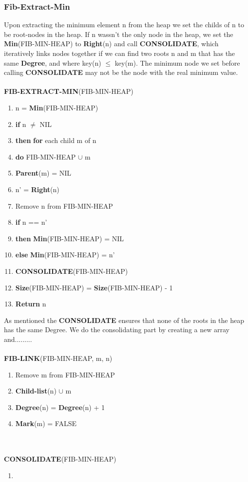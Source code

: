 \documentclass[11pt]{article}
\begin{document}
\subsubsection{Fib-Extract-Min}
Upon extracting the minimum element n from the heap we set the childs of n to be root-nodes in the heap. If n wassn't the only node in the heap, we set the \textbf{Min}(FIB-MIN-HEAP) to \textbf{Right}(n) and call \textbf{CONSOLIDATE}, which iteratively links nodes together if we can find two roots n and m that has the same \textbf{Degree}, and where key(n) $\leq$ key(m). The minimum node we set before calling \textbf{CONSOLIDATE} may not be the node with the real minimum value.\\\\
\textbf{FIB-EXTRACT-MIN}(FIB-MIN-HEAP)
\begin{enumerate}
\setlength\itemsep{0em}
\item n = \textbf{Min}(FIB-MIN-HEAP)
\item \textbf{if } n $\neq$ NIL
\item \tab \textbf{then } \textbf{for } each child m of n
\item \tab \tab \tab \textbf{do } FIB-MIN-HEAP $\cup$ m
\item \tab \tab \tab \tab \textbf{Parent}(m) = NIL
\item \tab \tab \tab n' = \textbf{Right}(n)
\item \tab \tab \tab Remove n from FIB-MIN-HEAP
\item \tab \tab \tab \textbf{if } n == n'
\item \tab \tab \tab \tab \textbf{then } \textbf{Min}(FIB-MIN-HEAP) = NIL
\item \tab \tab \tab \tab \textbf{else } \textbf{Min}(FIB-MIN-HEAP) = n'
\item \tab \tab \tab \tab \tab \textbf{CONSOLIDATE}(FIB-MIN-HEAP)
\item \tab \tab \tab \textbf{Size}(FIB-MIN-HEAP) = \textbf{Size}(FIB-MIN-HEAP) - 1
\item \textbf{Return } n
\end{enumerate}
As mentioned the \textbf{CONSOLIDATE} ensures that none of the roots in the heap has the same Degree. We do the consolidating part by creating a new array and.........\\\\
\textbf{FIB-LINK}(FIB-MIN-HEAP, m, n)
\begin{enumerate}
\setlength\itemsep{0em}
\item Remove m from FIB-MIN-HEAP
\item \textbf{Child-list}(n) $\cup$ m
\item \textbf{Degree}(n) = \textbf{Degree}(n) + 1
\item \textbf{Mark}(m) = FALSE
\end{enumerate}
\\\\
\textbf{CONSOLIDATE}(FIB-MIN-HEAP)
\begin{enumerate}
\setlength\itemsep{0em}
\item \textbf{}
\end{enumerate}
\fi
\newpage
\end{document}
